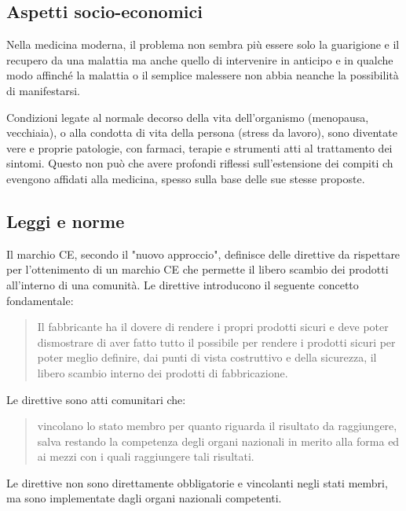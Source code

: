 \documentclass[a4paper]{article}
\begin{document}
\subsection{Aspetti socio-economici}
Nella medicina moderna, il problema non sembra più essere solo la guarigione e il 
recupero da una malattia ma anche quello di intervenire in anticipo e in qualche 
modo affinché la malattia o il semplice malessere non abbia neanche la possibilità 
di manifestarsi.

Condizioni legate al normale decorso della vita dell'organismo (menopausa, vecchiaia), 
o alla condotta di vita della persona (stress da lavoro), sono diventate vere e proprie 
patologie, con farmaci, terapie e strumenti atti al trattamento dei sintomi. Questo non 
può che avere profondi riflessi sull'estensione dei compiti ch evengono affidati alla 
medicina, spesso sulla base delle sue stesse proposte.

\subsection{Leggi e norme}
Il marchio CE, secondo il "nuovo approccio", definisce delle direttive da rispettare per 
l'ottenimento di un marchio CE che permette il libero scambio dei prodotti all'interno 
di una comunità. Le direttive introducono il seguente concetto fondamentale: 
\begin{quote}
    \centering
    Il fabbricante ha il dovere di rendere i propri prodotti sicuri e deve poter 
    dismostrare di aver fatto tutto il possibile per rendere i prodotti sicuri per poter 
    meglio definire, dai punti di vista costruttivo e della sicurezza, il libero scambio 
    interno dei prodotti di fabbricazione.
\end{quote}
Le direttive sono atti comunitari che:
\begin{quote}
    \centering
    vincolano lo stato membro per quanto riguarda il risultato da raggiungere, salva 
    restando la competenza degli organi nazionali in merito alla forma ed ai mezzi con 
    i quali raggiungere tali risultati.
\end{quote}
Le direttive non sono direttamente obbligatorie e vincolanti negli stati membri, ma sono 
implementate dagli organi nazionali competenti.
\end{document}
